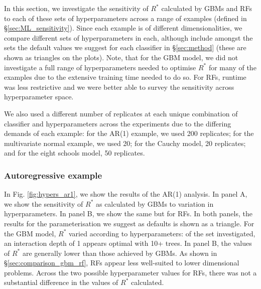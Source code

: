 \documentclass[ba]{imsart}
\numberwithin{equation}{section}
\theoremstyle{plain}
\begin{document}
\begin{supplement}
		In this section, we investigate the sensitivity of $R^*$ calculated by GBMs and RFs to each of these sets of hyperparameters across a range of examples (defined in \S\ref{sec:ML_sensitivity}). Since each example is of different dimensionalities, we compare different sets of hyperparameters in each, although include amongst the sets the default values we suggest for each classifier in \S\ref{sec:method} (these are shown as triangles on the plots). Note, that for the GBM model, we did not investigate a full range of hyperparameters needed to optimise $R^*$ for many of the examples due to the extensive training time needed to do so. For RFs, runtime was less restrictive and we were better able to survey the sensitivity across hyperparameter space.
		
		We also used a different number of replicates at each unique combination of classifier and hyperparameters across the experiments due to the differing demands of each example: for the AR(1) example, we used 200 replicates; for the multivariate normal example, we used 20; for the Cauchy model, 20 replicates; and for the eight schools model, 50 replicates.
		
		
		\subsubsection{Autoregressive example}\label{sec:hyperparameters_ar1}
		In Fig. \ref{fig:hypers_ar1}, we show the results of the AR(1) analysis. In panel A, we show the sensitivity of $R^*$ as calculated by GBMs to variation in hyperparameters. In panel B, we show the same but for RFs. In both panels, the results for the parameterisation we suggest as defaults is shown as a triangle. For the GBM model, $R^*$ varied according to hyperparameters: of the set investigated, an interaction depth of 1 appears optimal with 10+ trees. In panel B, the values of $R^*$ are generally lower than those achieved by GBMs. As shown in \S\ref{sec:comparison_gbm_rf}, RFs appear less well-suited to lower dimensional problems. Across the two possible hyperparameter values for RFs, there was not a substantial difference in the values of $R^*$ calculated.
		

\end{supplement}
\end{document}
